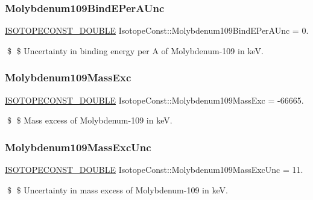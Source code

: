 \subsubsection{\texorpdfstring{Molybdenum109\+Bind\+E\+Per\+A\+Unc}{Molybdenum109BindEPerAUnc}}
{\footnotesize\ttfamily \mbox{\hyperlink{group___isotope_const-_macros_ga8f45a7272ce02c0b4c65c44636ed719a}{I\+S\+O\+T\+O\+P\+E\+C\+O\+N\+S\+T\+\_\+\+D\+O\+U\+B\+LE}} Isotope\+Const\+::\+Molybdenum109\+Bind\+E\+Per\+A\+Unc = 0.}

\$ \$ Uncertainty in binding energy per A of Molybdenum-\/109 in keV. \mbox{\label{group___isotope_const-_molybdenum-_mo109_gaba4df23cdcc2ac1c0ae2330871210d3c}} 
\subsubsection{\texorpdfstring{Molybdenum109\+Mass\+Exc}{Molybdenum109MassExc}}
{\footnotesize\ttfamily \mbox{\hyperlink{group___isotope_const-_macros_ga8f45a7272ce02c0b4c65c44636ed719a}{I\+S\+O\+T\+O\+P\+E\+C\+O\+N\+S\+T\+\_\+\+D\+O\+U\+B\+LE}} Isotope\+Const\+::\+Molybdenum109\+Mass\+Exc = -\/66665.}

\$ \$ Mass excess of Molybdenum-\/109 in keV. \mbox{\label{group___isotope_const-_molybdenum-_mo109_ga8fc653e538adc9ab2b978792da4f80ac}} 
\subsubsection{\texorpdfstring{Molybdenum109\+Mass\+Exc\+Unc}{Molybdenum109MassExcUnc}}
{\footnotesize\ttfamily \mbox{\hyperlink{group___isotope_const-_macros_ga8f45a7272ce02c0b4c65c44636ed719a}{I\+S\+O\+T\+O\+P\+E\+C\+O\+N\+S\+T\+\_\+\+D\+O\+U\+B\+LE}} Isotope\+Const\+::\+Molybdenum109\+Mass\+Exc\+Unc = 11.}

\$ \$ Uncertainty in mass excess of Molybdenum-\/109 in keV. \mbox{\label{group___isotope_const-_molybdenum-_mo109_ga2b9fc1987124eb922b83c1b77d6f5008}} 
